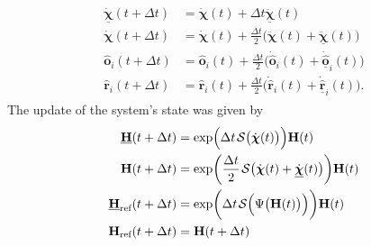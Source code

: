 \begin{align}
    \begin{split}
        \underline{\dot{\boldsymbol{\chi}}}(t + \Delta t) &= \dot{\boldsymbol{\chi}}(t) + \Delta t \ddot{\underline{\boldsymbol{\chi}}}(t)\\
        \dot{\boldsymbol{\chi}}(t + \Delta t) &= \dot{\boldsymbol{\chi}}(t) + \frac{\Delta t}{2} \bigl(\ddot{\boldsymbol{\chi}}(t) + \underline{\ddot{\boldsymbol{\chi}}}(t)\bigr)\\
        \widehat{\mathbf{o}}_i(t + \Delta t) &= \widehat{\mathbf{o}}_i(t) + \frac{\Delta t}{2} \bigl(\dot{\widehat{\mathbf{o}}}_i(t) + \underline{\dot{\widehat{\mathbf{o}}}}_i(t)\bigr)\\
        \widehat{\mathbf{r}}_i(t + \Delta t) &= \widehat{\mathbf{r}}_i(t) + \frac{\Delta t}{2} \bigl(\dot{\widehat{\mathbf{r}}}_i(t) + \underline{\dot{\widehat{\mathbf{r}}}}_i(t)\bigr).
    \end{split}
\end{align}
The update of the system's state was given by
\begin{align}
    \begin{split}
        \underline{\mathbf{H}}(t +\Delta t) &= \exp\Bigl(\Delta t\SL\bigl(\dot{\boldsymbol{\chi}}(t)\bigr)\Bigr)\mathbf{H}(t)\\
        \mathbf{H}(t + \Delta t) &= \exp\biggl(\frac{\Delta t}{2}\SL[\dot{\boldsymbol{\chi}}(t) + \underline{\dot{\boldsymbol{\chi}}}(t)]\biggr)\mathbf{H}(t)\\
        \underline{\mathbf{H}}_\text{ref}(t +\Delta t) &= \exp\biggl(\Delta t\SL\Bigl(\Psi\bigl(\mathbf{H}(t)\bigr)\Bigr)\biggr)\mathbf{H}(t)\\
        \mathbf{H}_\text{ref} (t + \Delta t) &= \mathbf{H}(t + \Delta t)
    \end{split}
\end{align}

